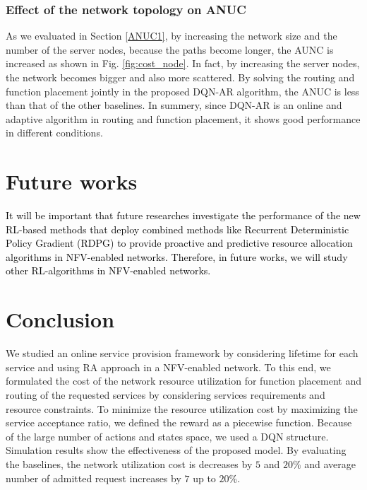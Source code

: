 \documentclass[20pt,twocolumn]{IEEEtran}
\begin{document}
\subsubsection{Effect of the network topology on ANUC}
As we evaluated in Section \ref{ANUC1},
by increasing the network size and the number of the server nodes, because  the paths become longer, the AUNC is increased as shown in
Fig. \ref{fig:cost_node}. In fact, by increasing the server nodes, the network becomes bigger and also more scattered.
By solving the routing and function placement jointly in the proposed DQN-AR algorithm,  the ANUC is less than  that of the other baselines. In summery, since DQN-AR is an online
and adaptive algorithm in routing and function placement, it
shows good performance in different conditions.
\section{Future works}\label{Future_work}
\textcolor{black}{It will be important that future researches investigate the performance of the new RL-based methods that deploy combined methods like Recurrent Deterministic Policy Gradient (RDPG) to provide proactive and predictive resource allocation algorithms in NFV-enabled networks.  Therefore, in future works, we will study other RL-algorithms in NFV-enabled networks.}
\section{Conclusion}\label{Conclusion}
We studied an online service  provision framework by considering lifetime for each service and using  RA approach in a NFV-enabled network.
To this end, we formulated the cost of the network resource utilization for function placement and routing of the requested services by considering services requirements and resource constraints. To minimize the resource utilization cost by maximizing the service acceptance ratio, we defined the reward as a piecewise function.
Because of the large number of actions and states space, we used a DQN structure. %
Simulation results show the effectiveness of the proposed model. By evaluating the baselines, the network utilization cost is decreases by $5$ and $20\%$ and average number of admitted request increases  by $7$ up to $20$\%.


\end{document}

